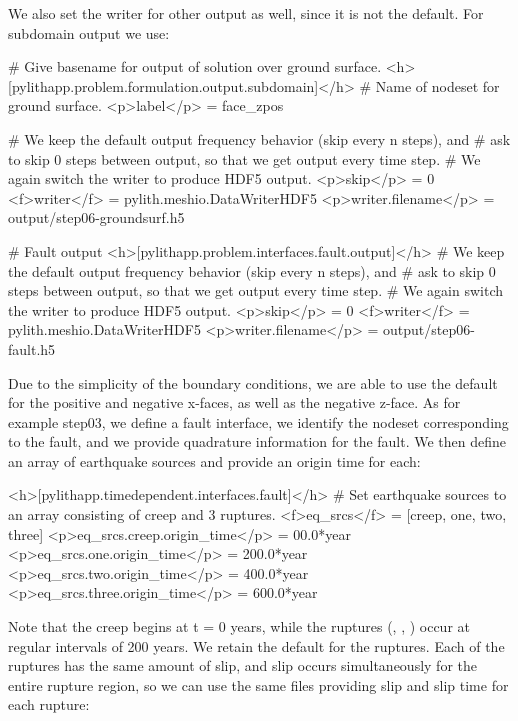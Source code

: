 We also set the writer for other output as well, since it is not the
default. For subdomain output we use:
\begin{cfg}
# Give basename for output of solution over ground surface.
<h>[pylithapp.problem.formulation.output.subdomain]</h>
# Name of nodeset for ground surface.
<p>label</p> = face_zpos

# We keep the default output frequency behavior (skip every n steps), and
# ask to skip 0 steps between output, so that we get output every time step.
# We again switch the writer to produce HDF5 output.
<p>skip</p> = 0
<f>writer</f> = pylith.meshio.DataWriterHDF5
<p>writer.filename</p> = output/step06-groundsurf.h5  

# Fault output
<h>[pylithapp.problem.interfaces.fault.output]</h>
# We keep the default output frequency behavior (skip every n steps), and
# ask to skip 0 steps between output, so that we get output every time step.
# We again switch the writer to produce HDF5 output.
<p>skip</p> = 0
<f>writer</f> = pylith.meshio.DataWriterHDF5
<p>writer.filename</p> = output/step06-fault.h5
\end{cfg}
Due to the simplicity of the boundary conditions, we are able to use
the default  for the positive and negative x-faces,
as well as the negative z-face. As for example step03, we define a
fault interface, we identify the nodeset corresponding to the fault,
and we provide quadrature information for the fault. We then define
an array of earthquake sources and provide an origin time for each:
\begin{cfg}
<h>[pylithapp.timedependent.interfaces.fault]</h>
# Set earthquake sources to an array consisting of creep and 3 ruptures.
<f>eq_srcs</f> = [creep, one, two, three]
<p>eq_srcs.creep.origin_time</p> = 00.0*year
<p>eq_srcs.one.origin_time</p> = 200.0*year
<p>eq_srcs.two.origin_time</p> = 400.0*year
<p>eq_srcs.three.origin_time</p> = 600.0*year
\end{cfg}
Note that the creep begins at t = 0 years, while the ruptures (,
, ) occur at regular intervals of 200 years.
We retain the default  for the ruptures. Each of
the ruptures has the same amount of slip, and slip occurs simultaneously
for the entire rupture region, so we can use the same 
files providing slip and slip time for each rupture:
